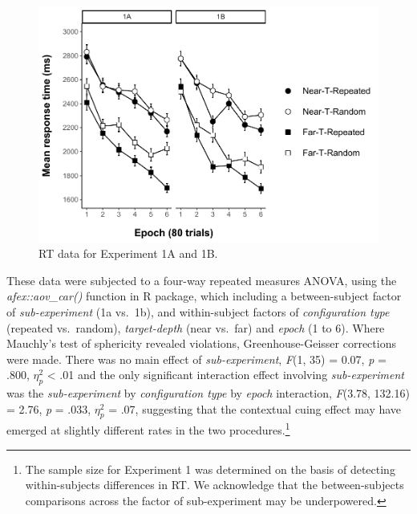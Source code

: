 \documentclass[
  english,
  man,floatsintext]{apa7}
\begin{document}
\begin{figure}

{\centering \includegraphics[width=1\linewidth]{CCVR_manuscript_files/figure-latex/Exp1-RT-figure-1} 

}

\caption{RT data for Experiment 1A and 1B.}\label{fig:Exp1-RT-figure}
\end{figure}

These data were subjected to a four-way repeated measures ANOVA, using the \emph{afex::aov\_car()} function in R package, which including a between-subject factor of \emph{sub-experiment} (1a vs.~1b), and within-subject factors of \emph{configuration type} (repeated vs.~random), \emph{target-depth} (near vs.~far) and \emph{epoch} (1 to 6). Where Mauchly's test of sphericity revealed violations, Greenhouse-Geisser corrections were made. There was no main effect of \emph{sub-experiment}, \emph{F}(1, 35) = 0.07, \emph{p} = .800, \(\eta^2_p\) \textless{} .01 and the only significant interaction effect involving \emph{sub-experiment} was the \emph{sub-experiment} by \emph{configuration type} by \emph{epoch} interaction, \emph{F}(3.78, 132.16) = 2.76, \emph{p} = .033, \(\eta^2_p\) = .07, suggesting that the contextual cuing effect may have emerged at slightly different rates in the two procedures.\footnote{The sample size for Experiment 1 was determined on the basis of detecting within-subjects differences in RT. We acknowledge that the between-subjects comparisons across the factor of sub-experiment may be underpowered.}
\end{document}
